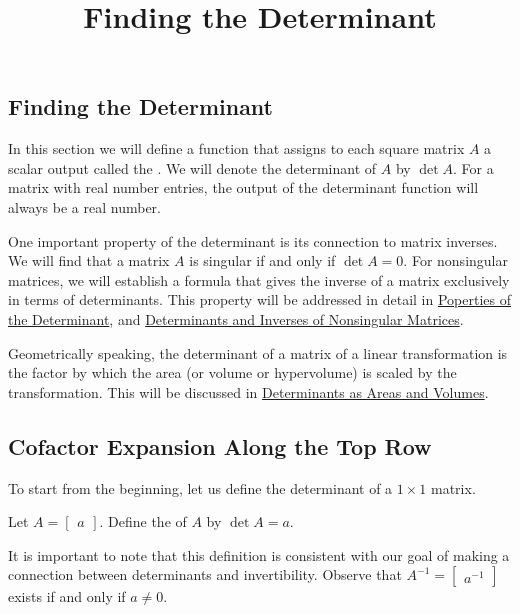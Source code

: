 \documentclass{ximera}
\title{Finding the Determinant} \license{CC BY-NC-SA 4.0}
\begin{document}
\begin{abstract}

\end{abstract}
\maketitle

\begin{onlineOnly}
\section*{Finding the Determinant}
\end{onlineOnly}

In this section we will define a function that assigns to each square matrix $A$ a scalar output called the .  We will denote the determinant of $A$ by $\det{A}$.  For a matrix with real number entries, the output of the determinant function will always be a real number.

One important property of the determinant is its connection to matrix inverses.  We will find that a matrix $A$ is singular if and only if $\det{A}=0$.  For nonsingular matrices, we will establish a formula that gives the inverse of a matrix exclusively in terms of determinants.  This property will be addressed in detail in \href{https://ximera.osu.edu/oerlinalg/LinearAlgebra/DET-0040/main}{Poperties of the Determinant}, and \href{https://ximera.osu.edu/oerlinalg/LinearAlgebra/DET-0060/main}{Determinants and Inverses of Nonsingular Matrices}.

Geometrically speaking, the determinant of a matrix of a linear transformation is the factor by which the area (or volume or hypervolume) is scaled by the transformation.  This will be discussed in \href{https://ximera.osu.edu/oerlinalg/LinearAlgebra/DET-0070/main}{Determinants as Areas and Volumes}. 

\subsection*{Cofactor Expansion Along the Top Row}
To start from the beginning, let us define the determinant of a $1\times 1$ matrix.

\begin{definition}\label{def:onebyonedet} Let
$A=\begin{bmatrix}a\end{bmatrix}$.  Define the  of $A$ by $\det{A}=a$.
\end{definition}
It is important to note that this definition is consistent with our goal of making a connection between determinants and invertibility.  Observe that $A^{-1}=\begin{bmatrix}a^{-1}\end{bmatrix}$ exists if and only if $a\neq 0$.
\end{document}
